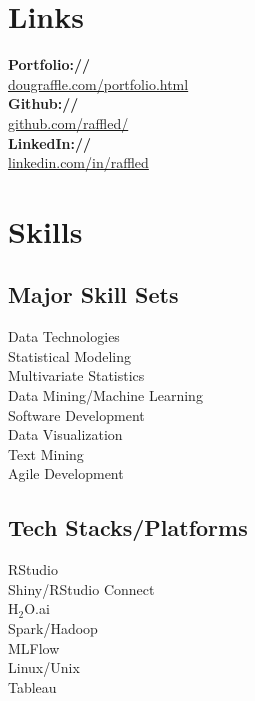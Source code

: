 \documentclass[letterpaper]{deedy-resume} %
\begin{document}
\begin{minipage}[t]{0.33\textwidth}
\section{Links} 
{\bf Portfolio://}\\ \href{http://www.dougraffle.com/portfolio.html}{dougraffle.com/portfolio.html}\\
{\bf Github://}\\ \href{http://github.com/raffled/}{github.com/raffled/}\\
{\bf LinkedIn://}\\ \href{https://www.linkedin.com/in/raffled}{linkedin.com/in/raffled} \\
\sectionspace %


\section{Skills}
\subsection{Major Skill Sets}
Data Technologies\\
Statistical Modeling\\
Multivariate Statistics\\
Data Mining/Machine Learning\\
Software Development\\
Data Visualization\\
Text Mining\\
Agile Development\\

\sectionspace %
\vspace{3pt}

\subsection{Tech Stacks/Platforms}
RStudio\\
Shiny/RStudio Connect\\
H$_2$O.ai\\
Spark/Hadoop\\
MLFlow\\
Linux/Unix\\
Tableau


\end{minipage}
\end{document}
